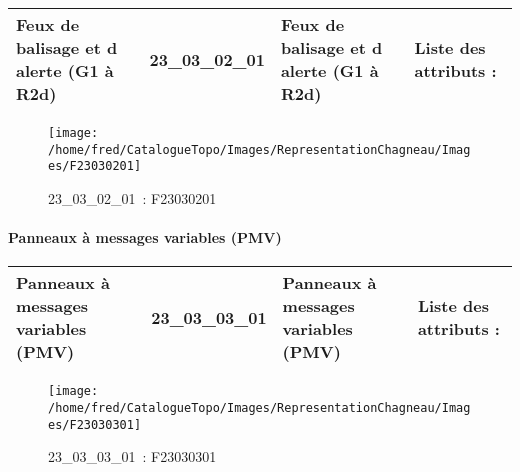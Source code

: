 \documentclass[12pt,titlepage,oneside]{book}
\begin{document}
\renewcommand{\arraystretch}{1.2}
\begin{supertabular}{|p{10cm}|c|p{13cm}|p{12cm}|}
 Feux de balisage et d alerte (G1 à R2d) & 23\_03\_02\_01 & Feux de balisage et d alerte (G1 à R2d) & Liste des attributs :
\begin{enumerate}
\end{enumerate}
\\
\hline
\end{supertabular}
\begin{figure}[h!]
  \hfill         %
  \begin{minipage}[t]{3cm}
    \begin{center}
      \texttt{[image: /home/fred/CatalogueTopo/Images/RepresentationChagneau/Images/F23030201]}
      \caption[~23\_03\_02\_01]{\small{23\_03\_02\_01~:} \tiny{F23030201}}\label{F23030201}
    \end{center}
  \end{minipage}
\end{figure}


\paragraph{Panneaux à messages variables (PMV)}
\noindent
\vspace{\baselineskip}

\renewcommand{\arraystretch}{1.2}
\begin{supertabular}{|p{10cm}|c|p{13cm}|p{12cm}|}
 Panneaux à messages variables (PMV) & 23\_03\_03\_01 & Panneaux à messages variables (PMV) & Liste des attributs :
\begin{enumerate}
\end{enumerate}
\\
\hline
\end{supertabular}
\begin{figure}[h!]
  \hfill         %
  \begin{minipage}[t]{3cm}
    \begin{center}
      \texttt{[image: /home/fred/CatalogueTopo/Images/RepresentationChagneau/Images/F23030301]}
      \caption[~23\_03\_03\_01]{\small{23\_03\_03\_01~:} \tiny{F23030301}}\label{F23030301}
    \end{center}
  \end{minipage}
\end{figure}
\end{document}
